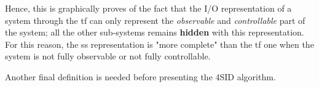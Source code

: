 \begin{remark}
\begin{figure}[H]
    \end{figure}
    
    \vspace{-15pt}
    
    Hence, this is graphically proves of the fact that the I/O representation of a system through the \acrlong{tf} can only represent the \emph{observable} and \emph{controllable} part of the system; all the other sub-systems remains \textbf{hidden} with this representation. For this reason, the \gls{ss} representation is "more complete" than the \gls{tf} one when the system is not fully observable or not fully controllable.
\end{remark}

Another final definition is needed before presenting the 4SID algorithm.

